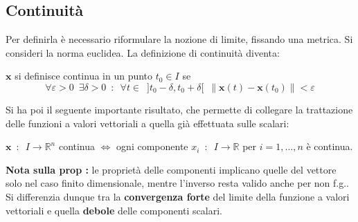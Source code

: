 \documentclass[10pt, oneside]{book}
\theoremstyle{plain}
\begin{document}
\subsection{Continuità}
Per definirla è necessario riformulare la nozione di limite, fissando una metrica. Si consideri la norma euclidea. La definizione di continuità diventa:
\begin{defin}
$\mathbf{x}$ si definisce continua in un punto $t_0 \in I$ se 
\[\forall \varepsilon > 0 \enspace \exists \delta > 0 \enspace : \enspace \forall t \in \enspace ]t_0 - \delta, t_0 + \delta[ \enspace \|\mathbf{x}(t) - \mathbf{x}(t_0)\| < \varepsilon\]
\end{defin}
Si ha poi il seguente importante risultato, che permette di collegare la trattazione delle funzioni a valori vettoriali a quella già effettuata sulle scalari:
\begin{prop}
$\displaystyle \mathbf{x} \enspace : \enspace I \rightarrow \mathbb{R}^n$ continua $\Leftrightarrow$ ogni componente $x_i \enspace : \enspace I \rightarrow \mathbb{R}$ per $i = 1, ..., n$ è continua.
\end{prop}
\textbf{Nota sulla prop :} le proprietà delle componenti implicano quelle del vettore solo nel caso finito dimensionale, mentre l'inverso resta valido anche per non f.g.. Si differenzia dunque tra la \textbf{convergenza forte} del limite della funzione a valori vettoriali e quella \textbf{debole} delle componenti scalari.
\end{document}
